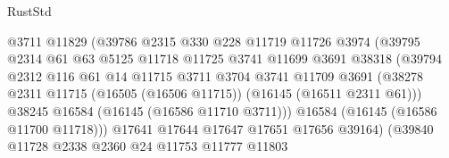 \begin{lexlean}{RustStd}
\begin{coremodule}
                                    @3711
                                    @11829
                                    (@39786
                                      @2315
                                      @330
                                      @228
                                      @11719
                                      @11726
                                      @3974
                                      (@39795
                                        @2314
                                        @61
                                        @63
                                        @5125
                                        @11718
                                        @11725
                                        @3741
                                        @11699
                                        @3691
                                        @38318
                                        (@39794
                                          @2312
                                          @116
                                          @61
                                          @14
                                          @11715
                                          @3711
                                          @3704
                                          @3741
                                          @11709
                                          @3691
                                          (@38278
                                            @2311
                                            @11715
                                            (@16505 (@16506 @11715))
                                            (@16145 (@16511 @2311 @61)))
                                          @38245
                                          @16584
                                          (@16145 (@16586 @11710 @3711)))
                                        @16584
                                        (@16145 (@16586 @11700 @11718)))
                                      @17641
                                      @17644
                                      @17647
                                      @17651
                                      @17656
                                      @39164)
                                    (@39840
                                      @11728
                                      @2338
                                      @2360
                                      @24
                                      @11753
                                      @11777
                                      @11803

\end{coremodule}
\end{lexlean}
